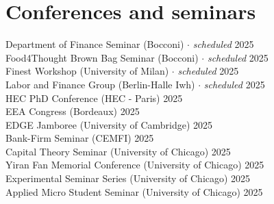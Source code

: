 \documentclass[A4,11pt]{article}
\begin{document}
\section{Conferences and seminars}
\hspace{12pt} Department of Finance Seminar (Bocconi) \hspace{0.3em} $\cdot$ \hspace{0.3em} \textit{scheduled}  \hfill 2025\\
\smallskip
\hspace{12pt} Food4Thought Brown Bag Seminar (Bocconi) \hspace{0.3em} $\cdot$ \hspace{0.3em} \textit{scheduled} \hfill 2025\\
\smallskip
\hspace{12pt} Finest Workshop (University of Milan) \hspace{0.3em} $\cdot$ \hspace{0.3em} \textit{scheduled} \hfill 2025\\
\smallskip
\hspace{12pt} Labor and Finance Group (Berlin-Halle Iwh) \hspace{0.3em} $\cdot$ \hspace{0.3em} \textit{scheduled} \hfill 2025\\
\smallskip
\hspace{12pt} HEC PhD Conference (HEC - Paris) \hfill 2025\\
\smallskip
\hspace{12pt} EEA Congress (Bordeaux) \hfill 2025\\
\smallskip
\hspace{12pt} EDGE Jamboree (University of Cambridge) \hfill 2025\\
\smallskip
\hspace{12pt} Bank-Firm Seminar (CEMFI) \hfill 2025\\
\smallskip
\hspace{12pt} Capital Theory Seminar (University of Chicago) \hfill 2025\\
\smallskip
\hspace{12pt} Yiran Fan Memorial Conference (University of Chicago) \hfill 2025\\
\smallskip
\hspace{12pt} Experimental Seminar Series (University of Chicago) \hfill 2025\\
\smallskip
\hspace{12pt} Applied Micro Student Seminar (University of Chicago) \hfill 2025\\
\end{document}
